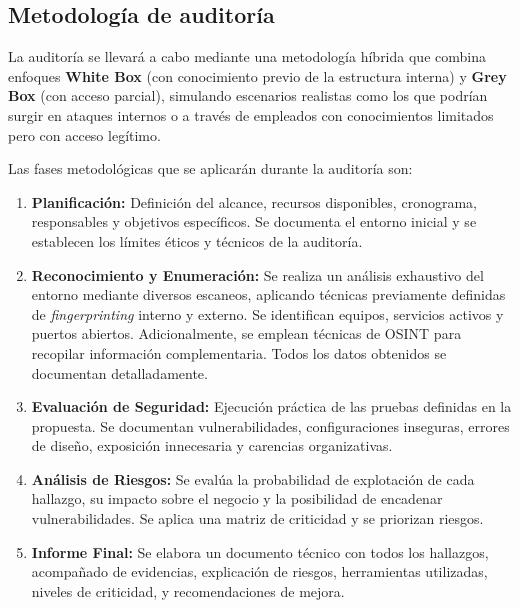 \documentclass[a4paper, 10pt]{article}
\begin{document}
\clearpage

























\subsection{Metodología de auditoría}

La auditoría se llevará a cabo mediante una metodología híbrida que combina enfoques \textbf{White Box} (con conocimiento previo de la estructura interna) y \textbf{Grey Box} (con acceso parcial), simulando escenarios realistas como los que podrían surgir en ataques internos o a través de empleados con conocimientos limitados pero con acceso legítimo.

\par\vspace{0.5cm}
Las fases metodológicas que se aplicarán durante la auditoría son:

\begin{enumerate}
\item \textbf{Planificación:} Definición del alcance, recursos disponibles, cronograma, responsables y objetivos específicos. Se documenta el entorno inicial y se establecen los límites éticos y técnicos de la auditoría.

\item \textbf{Reconocimiento y Enumeración:} Se realiza un análisis exhaustivo del entorno mediante diversos escaneos, aplicando técnicas previamente definidas de \textit{fingerprinting} interno y externo. Se identifican equipos, servicios activos y puertos abiertos. Adicionalmente, se emplean técnicas de OSINT para recopilar información complementaria. Todos los datos obtenidos se documentan detalladamente.

\item \textbf{Evaluación de Seguridad:} Ejecución práctica de las pruebas definidas en la propuesta. Se documentan vulnerabilidades, configuraciones inseguras, errores de diseño, exposición innecesaria y carencias organizativas.

\item \textbf{Análisis de Riesgos:} Se evalúa la probabilidad de explotación de cada hallazgo, su impacto sobre el negocio y la posibilidad de encadenar vulnerabilidades. Se aplica una matriz de criticidad y se priorizan riesgos.

\item \textbf{Informe Final:} Se elabora un documento técnico con todos los hallazgos, acompañado de evidencias, explicación de riesgos, herramientas utilizadas, niveles de criticidad, y recomendaciones de mejora.

\end{enumerate}
\end{document}
